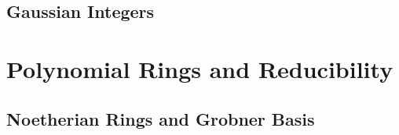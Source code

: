 \documentclass{memoir}
\begin{document}
\section{Gaussian Integers}
\label{sec:gaussian_integers}


%
%
%

\chapter{Polynomial Rings and Reducibility}
\label{cha:polynomial_rings_and_reducibility}




\section{Noetherian Rings and Grobner Basis}
\label{sec:noetherian_rings_and_grobner_basis}




\end{document}
